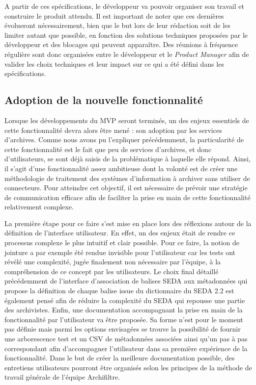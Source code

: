 
A partir de ces spécifications, le développeur va pouvoir organiser son travail et construire le produit attendu. Il est important de noter que ces dernières évolueront nécessairement, bien que le but lors de leur rédaction soit de les limiter autant que possible, en fonction des solutions techniques proposées par le développeur et des blocages qui peuvent apparaître. Des réunions à fréquence régulière sont donc organisées entre le développeur et le \textit{\gls{Product Manager}} afin de valider les choix techniques et leur impact sur ce qui a été défini dans les spécifications. 

\subsection{Adoption de la nouvelle fonctionnalité}


Lorsque les développements du \gls{MVP} seront terminés, un des enjeux essentiels de cette fonctionnalité devra alors être mené : son adoption par les services d’archives. Comme nous avons pu l’expliquer précédemment, la particularité de cette fonctionnalité est le fait que peu de services d’archives, et donc d’utilisateurs, se sont déjà saisis de la problématique à laquelle elle répond. Ainsi, il s’agit d’une fonctionnalité assez ambitieuse dont la volonté est de créer une méthodologie de traitement des systèmes d’information à archiver sans utiliser de connecteurs. Pour atteindre cet objectif, il est nécessaire de prévoir une stratégie de communication efficace afin de faciliter la prise en main de cette fonctionnalité relativement complexe. 


La première étape pour ce faire s’est mise en place lors des réflexions autour de la définition de l’interface utilisateur. En effet, un des enjeux était de rendre ce processus complexe le plus intuitif et clair possible. Pour ce faire, la notion de jointure a par exemple été rendue invisible pour l’utilisateur car les tests ont révélé une complexité, jugée finalement non nécessaire par l’équipe, à la compréhension de ce concept par les utilisateurs. Le choix final détaillé précédemment de l’interface d’association de balises \gls{SEDA} aux métadonnées qui propose la définition de chaque balise issue du dictionnaire du \gls{SEDA} 2.2 est également pensé afin de réduire la complexité du \gls{SEDA} qui repousse une partie des archivistes. Enfin, une documentation accompagnant la prise en main de la fonctionnalité par l’utilisateur va être proposée. Sa forme n’est pour le moment pas définie mais parmi les options envisagées se trouve la possibilité de fournir une arborescence test et un CSV de métadonnées associées ainsi qu’un pas à pas correspondant afin d’accompagner l’utilisateur dans sa première expérience de la fonctionnalité. Dans le but de créer la meilleure documentation possible, des entretiens utilisateurs pourront être organisés selon les principes de la méthode de travail générale de l’équipe \gls{Archifiltre}.  


